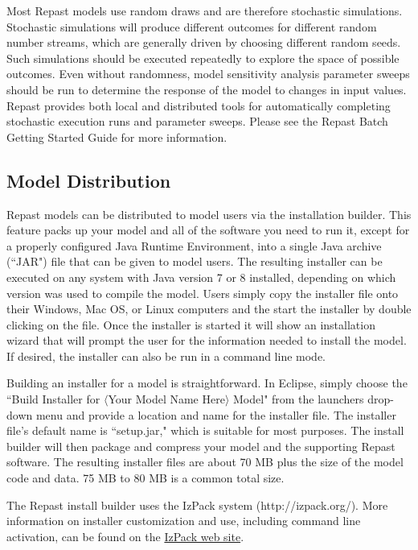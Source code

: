 \documentclass[11pt]{amsart}
\begin{document}
Most Repast models use random draws and are therefore stochastic simulations. Stochastic simulations will produce different outcomes for different random number streams, which are generally driven by choosing different random seeds. Such simulations should be executed repeatedly to explore the space of possible outcomes. Even without randomness, model sensitivity analysis parameter sweeps should be run to determine the response of the model to changes in input values. Repast provides both local and distributed tools for automatically completing stochastic execution runs and parameter sweeps. Please see the Repast Batch Getting Started Guide for more information.

\subsection{Model Distribution}

Repast models can be distributed to model users via the installation builder. This feature packs up your model and all of the software you need to run it, except for a properly configured Java Runtime Environment, into a single Java archive (``JAR") file that can be given to model users. The resulting installer can be executed on any system with Java version 7 or 8 installed, depending on which version was used to compile the model. Users simply copy the installer file onto their Windows, Mac OS, or Linux computers and the start the installer by double clicking on the file. Once the installer is started it will show an installation wizard that will prompt the user for the information needed to install the model. If desired, the installer can also be run in a command line mode.

Building an installer for a model is straightforward. In Eclipse, simply choose the ``Build Installer for $\langle$Your Model Name Here$\rangle$ Model" from the launchers drop-down menu and provide a location and name for the installer file. The installer file's default name is ``setup.jar," which is suitable for most purposes. The install builder will then package and compress your model and the supporting Repast software. The resulting installer files are about 70 MB plus the size of the model code and data. 75 MB to 80 MB is a common total size. 

The Repast install builder uses the IzPack system (http://izpack.org/). More information on installer customization and use, including command line activation, can be found on the \href{http://izpack.org/}{IzPack web site}.
\end{document}

